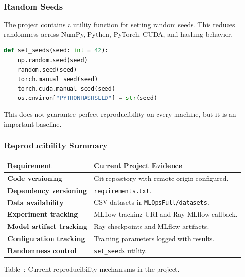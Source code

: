 \documentclass[11pt,a4paper]{article}
\begin{document}
\subsubsection{Random Seeds}

The project contains a utility function for setting random seeds. This reduces randomness across NumPy, Python, PyTorch, CUDA, and hashing behavior.

\begin{lstlisting}[style=projectcode,language=Python]
def set_seeds(seed: int = 42):
    np.random.seed(seed)
    random.seed(seed)
    torch.manual_seed(seed)
    torch.cuda.manual_seed(seed)
    os.environ["PYTHONHASHSEED"] = str(seed)
\end{lstlisting}

This does not guarantee perfect reproducibility on every machine, but it is an important baseline.

\subsubsection{Reproducibility Summary}

\begin{samepage}
\begin{center}
\centering
\begin{tabularx}{0.96\textwidth}{>{\bfseries}p{} X}
\toprule
Requirement & Current Project Evidence \\
\midrule
Code versioning & Git repository with remote origin configured. \\
Dependency versioning & \texttt{requirements.txt}. \\
Data availability & CSV datasets in \texttt{MLOpsFull/datasets}. \\
Experiment tracking & MLflow tracking URI and Ray MLflow callback. \\
Model artifact tracking & Ray checkpoints and MLflow artifacts. \\
Configuration tracking & Training parameters logged with results. \\
Randomness control & \texttt{set\_seeds} utility. \\
\bottomrule
\end{tabularx}
\vspace{0.35em}

{\small Table~\thetable: Current reproducibility mechanisms in the project.}
\end{center}
\end{samepage}
\end{document}
